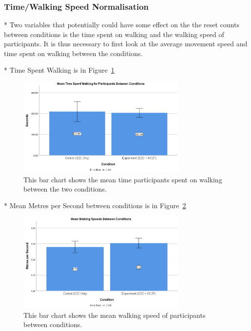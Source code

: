 \subsubsection{Time/Walking Speed Normalisation}
* Two variables that potentially could have some effect on the the reset counts between conditions is the time spent on walking and the walking speed of participants. It is thus necessary to first look at the average movement speed and time spent on walking between the conditions. 

* Time Spent Walking is in Figure~\ref{fig:TimeSpentWalkingBetweenConditions}
\begin{figure}[tbph]
    \centering
    \includegraphics[width=0.75\textwidth]{figures/graphs/TimeSpentWalkingBetweenConditions.png}
    \caption[Mean Time Spent Walking Between Conditions]{This bar chart shows the mean time participants spent on walking between the two conditions.}
    \label{fig:TimeSpentWalkingBetweenConditions}
\end{figure}

* Mean Metres per Second between conditions is in Figure~\ref{fig:ex2mps}
\begin{figure}[tbph]
    \centering
    \includegraphics[width=0.75\textwidth]{figures/graphs/mpsBetweenConditions.png}
    \caption[Mean Walking Speed Between Conditions]{This bar chart shows the mean walking speed of participants between conditions.}
    \label{fig:ex2mps}
\end{figure}

